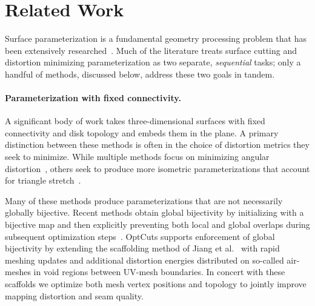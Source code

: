 
\section{Related Work}
\label{sec:related}
Surface parameterization is a fundamental geometry processing problem that has been extensively researched~\cite{Sheffer07_ParameterizationSurvey,Hormann2008}.
Much of the literature treats surface cutting and distortion minimizing parameterization as two separate, \emph{sequential} tasks; only a handful of methods, discussed below, address these two goals in tandem.

\paragraph{Parameterization with fixed connectivity.}
A significant body of work takes three-dimensional surfaces with fixed connectivity and disk topology and embeds them in the plane. A primary distinction between these methods is often in the choice of distortion metrics they seek to minimize.  While multiple methods focus on minimizing angular distortion~\cite{Floater2003,Sheffer2005ABFPP,Levy2002,Aigerman2015,Sawhney:2017}, others seek to produce more isometric parameterizations that account for triangle stretch~\cite{Sander2001Texture,Smith2015Bijective,Hormann2000MIPS,Rabinovich2017,Shtengel:GOvCM:2017,claici2017isometry}.

Many of these methods produce parameterizations that are not necessarily globally bijective. Recent methods obtain global bijectivity by initializing with a bijective map and then explicitly preventing both local and global overlaps during subsequent optimization steps~\cite{Smith2015Bijective,Jiang2017Simplicial}.
%
OptCuts supports enforcement of global bijectivity by extending the scaffolding method of Jiang et al.\  with rapid meshing updates and additional distortion energies distributed on so-called air-meshes in void regions between UV-mesh boundaries. In concert with these scaffolds we optimize both mesh vertex positions and topology to jointly improve mapping distortion 
and seam quality.
%

